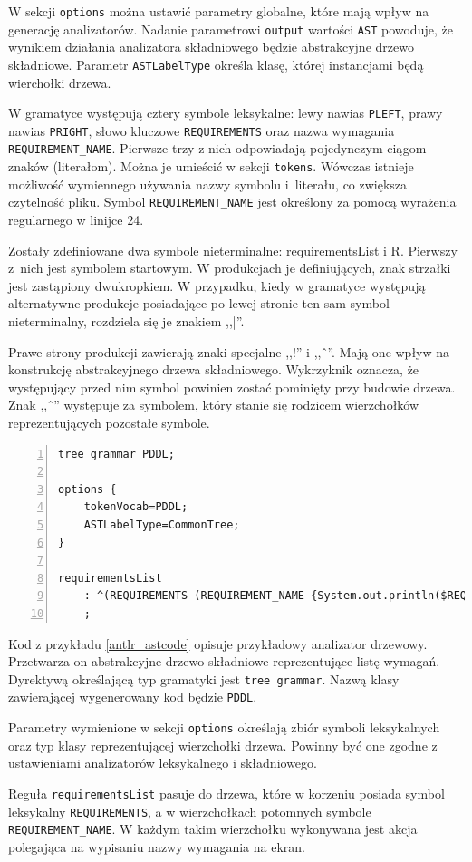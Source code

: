 W sekcji \texttt{options} można ustawić parametry globalne, które mają
wpływ na generację analizatorów. Nadanie parametrowi \texttt{output}
wartości \texttt{AST} powoduje, że wynikiem działania analizatora
składniowego będzie abstrakcyjne drzewo składniowe. Parametr 
\texttt{ASTLabelType} określa klasę, której instancjami będą
 wierchołki drzewa.

W gramatyce występują cztery symbole leksykalne: lewy nawias \texttt{PLEFT}, 
prawy nawias \texttt{PRIGHT}, słowo kluczowe \texttt{REQUIREMENTS} oraz
nazwa wymagania \texttt{REQUIREMENT\_NAME}. Pierwsze trzy z nich 
odpowiadają pojedynczym ciągom znaków (literałom). Można je umieścić
w sekcji \texttt{tokens}. Wówczas istnieje możliwość wymiennego używania 
nazwy symbolu i~literału, co zwiększa czytelność pliku. Symbol
\texttt{REQUIREMENT\_NAME} jest określony za pomocą wyrażenia regularnego
w linijce 24.

Zostały zdefiniowane dwa symbole nieterminalne: requirementsList i R.
Pierwszy z~nich jest symbolem startowym. W produkcjach
je definiujących, znak strzałki jest zastąpiony dwukropkiem. W przypadku,
kiedy w gramatyce występują alternatywne produkcje posiadające po lewej
stronie ten sam symbol nieterminalny, rozdziela się je znakiem ,,|''.

Prawe strony produkcji zawierają znaki specjalne ,,!'' i ,,\^\ ''. Mają one
wpływ na konstrukcję abstrakcyjnego drzewa składniowego. Wykrzyknik 
oznacza, że występujący przed nim symbol powinien zostać pominięty przy
budowie drzewa. Znak ,,\^\ '' występuje za symbolem, który stanie się rodzicem
wierzchołków reprezentujących pozostałe symbole.

\begin{Code}[h!]
\begin{lstlisting}[label=antlr_astcode, caption=Gramatyka analizatora drzewowego przetwarzającego listę wymagań, numbers=left, frame=single]
tree grammar PDDL;

options {
    tokenVocab=PDDL;
    ASTLabelType=CommonTree;
}

requirementsList
	: ^(REQUIREMENTS (REQUIREMENT_NAME {System.out.println($REQUIREMENT_NAME.text);)+) //$
	;
\end{lstlisting}
\end{Code}

Kod z przykładu \ref{antlr_astcode} opisuje przykładowy
analizator drzewowy. Przetwarza on
abstrakcyjne drzewo składniowe reprezentujące listę wymagań. Dyrektywą 
określającą typ gramatyki jest \texttt{tree grammar}. Nazwą klasy
zawierającej wygenerowany kod będzie \texttt{PDDL}.

Parametry wymienione w sekcji \texttt{options} określają zbiór symboli 
leksykalnych oraz typ klasy reprezentującej wierzchołki drzewa. Powinny
być one zgodne z ustawieniami analizatorów leksykalnego i składniowego.

Reguła \texttt{requirementsList} pasuje do drzewa, które w korzeniu
posiada symbol leksykalny \texttt{REQUIREMENTS}, a w wierzchołkach
potomnych symbole \texttt{REQUIREMENT\_NAME}. W każdym takim wierzchołku 
wykonywana jest akcja polegająca na wypisaniu nazwy wymagania na ekran.
